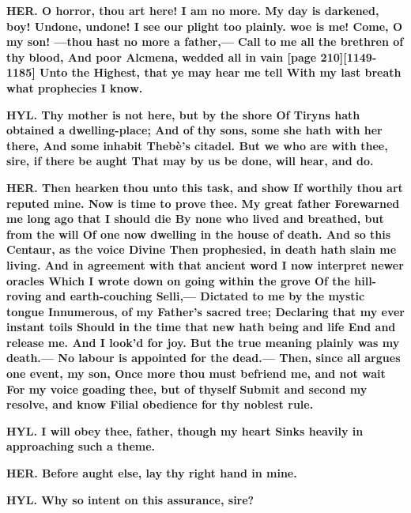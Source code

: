 \documentclass[11pt,letter]{book}
\begin{document}
\par \textbf{HER. O horror, thou art here! I am no more. My day is darkened, boy! Undone, undone! I see our plight too plainly. woe is me! Come, O my son! —thou hast no more a father,— Call to me all the brethren of thy blood, And poor Alcmena, wedded all in vain [page 210][1149-1185] Unto the Highest, that ye may hear me tell With my last breath what prophecies I know.}
\par 

\par \textbf{HYL. Thy mother is not here, but by the shore Of Tiryns hath obtained a dwelling-place; And of thy sons, some she hath with her there, And some inhabit Thebè’s citadel. But we who are with thee, sire, if there be aught That may by us be done, will hear, and do.}
\par 

\par \textbf{HER. Then hearken thou unto this task, and show If worthily thou art reputed mine. Now is time to prove thee. My great father Forewarned me long ago that I should die By none who lived and breathed, but from the will Of one now dwelling in the house of death. And so this Centaur, as the voice Divine Then prophesied, in death hath slain me living. And in agreement with that ancient word I now interpret newer oracles Which I wrote down on going within the grove Of the hill-roving and earth-couching Selli,— Dictated to me by the mystic tongue Innumerous, of my Father’s sacred tree; Declaring that my ever instant toils Should in the time that new hath being and life End and release me. And I look’d for joy. But the true meaning plainly was my death.— No labour is appointed for the dead.— Then, since all argues one event, my son, Once more thou must befriend me, and not wait For my voice goading thee, but of thyself Submit and second my resolve, and know Filial obedience for thy noblest rule.}
\par 

\par \textbf{HYL. I will obey thee, father, though my heart Sinks heavily in approaching such a theme.}
\par 

\par \textbf{HER. Before aught else, lay thy right hand in mine.}
\par 

\par \textbf{HYL. Why so intent on this assurance, sire?}
\par 
\end{document}
